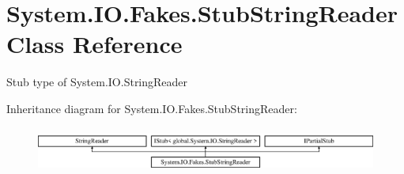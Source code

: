 \hypertarget{class_system_1_1_i_o_1_1_fakes_1_1_stub_string_reader}{\section{System.\-I\-O.\-Fakes.\-Stub\-String\-Reader Class Reference}
\label{class_system_1_1_i_o_1_1_fakes_1_1_stub_string_reader}
}


Stub type of System.\-I\-O.\-String\-Reader 


Inheritance diagram for System.\-I\-O.\-Fakes.\-Stub\-String\-Reader\-:\begin{figure}[H]
\begin{center}
\leavevmode
\includegraphics[height=1.523810cm]{class_system_1_1_i_o_1_1_fakes_1_1_stub_string_reader}
\end{center}
\end{figure}
